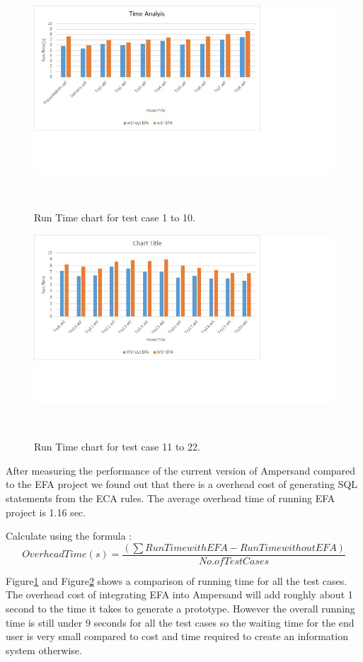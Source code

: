 \documentclass[12pt, svgnames]{article}
\begin{document}
\begin{figure}
  \centering
    \includegraphics[width=1.3\textwidth]{Chart1}
\caption{Run Time chart for test case 1 to 10.}~\label{fig:figure1}
\end{figure}


\begin{figure}
  \centering
    \includegraphics[width=1.3\textwidth]{Chart2}
\caption{Run Time chart for test case 11 to 22.}~\label{fig:figure2}
\end{figure}

After measuring the performance of the current version of Ampersand compared to the EFA project we found out that there is a overhead cost of generating SQL statements from the ECA rules. The average overhead time of running EFA project is 1.16 sec. 

Calculate using the formula : 
\begin{equation}
	Overhead Time(s) =\frac{\left ( \sum  Run Time with EFA - Run Time without EFA\right )}{ No. of Test Cases}
\end{equation}

Figure\ref{fig:figure1} and Figure\ref{fig:figure2} shows a comparison of running time for all the test cases. The overhead cost of integrating EFA into Ampersand will add roughly about 1 second to the time it takes to generate a prototype. However the overall running time is still under 9 seconds for all the test cases so the waiting time for the end user is very small compared to cost and time required to create an information system otherwise.
\end{document}
